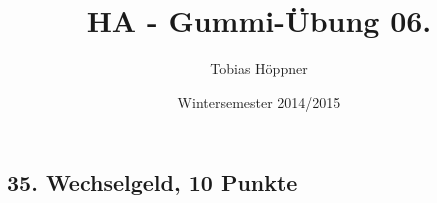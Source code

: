 \documentclass[ngerman,a4paper]{report}
\author{Tobias Höppner}
\title{HA - Gummi-Übung 06.}
\date{Wintersemester 2014/2015}
\renewcommand{\maketitle}{}
\begin{document}
 
\maketitle 

\subsection*{35. Wechselgeld, 10 Punkte}
\end{document}
